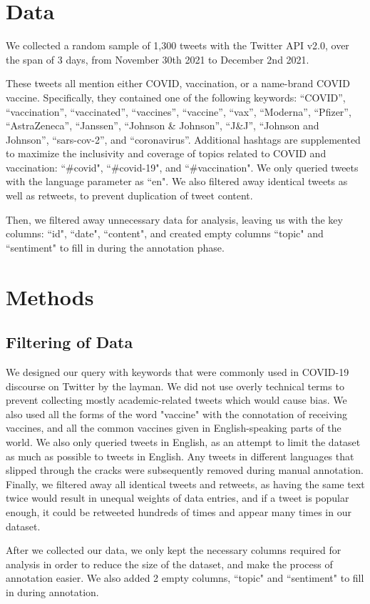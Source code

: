 \documentclass[letterpaper]{article} %
\begin{document}
\section{Data}
We collected a random sample of 1,300 tweets with the Twitter API v2.0, over the span of 3 days, from November 30th 2021 to December 2nd 2021. \par 
These tweets all mention either COVID, vaccination, or a name-brand COVID vaccine. Specifically, they contained one of the following keywords: “COVID”, “vaccination”, “vaccinated”, “vaccines”, “vaccine”, “vax”, “Moderna”, “Pfizer”, “AstraZeneca”, “Janssen”, “Johnson \& Johnson”, “J\&J”, “Johnson and Johnson”, “sars-cov-2”, and “coronavirus”. Additional hashtags are supplemented to maximize the inclusivity and coverage of topics related to COVID and vaccination: “\#covid", “\#covid-19", and “\#vaccination". We only queried tweets with the language parameter as ``en". We also filtered away identical tweets as well as retweets, to prevent duplication of tweet content. \par
Then, we filtered away unnecessary data for analysis, leaving us with the key columns: ``id", ``date", ``content", and created empty columns ``topic" and ``sentiment" to fill in during the annotation phase. 
\section{Methods}
\subsection{Filtering of Data}
We designed our query with keywords that were commonly used in COVID-19 discourse on Twitter by the layman. We did not use overly technical terms to prevent collecting mostly academic-related tweets which would cause bias. We also used all the forms of the word "vaccine" with the connotation of receiving vaccines, and all the common vaccines given in English-speaking parts of the world. We also only queried tweets in English, as an attempt to limit the dataset as much as possible to tweets in English. Any tweets in different languages that slipped through the cracks were subsequently removed during manual annotation. Finally, we filtered away all identical tweets and retweets, as having the same text twice would result in unequal weights of data entries, and if a tweet is popular enough, it could be retweeted hundreds of times and appear many times in our dataset. \par
After we collected our data, we only kept the necessary columns required for analysis in order to reduce the size of the dataset, and make the process of annotation easier. We also added 2 empty columns, ``topic" and ``sentiment" to fill in during annotation. 
\end{document}
